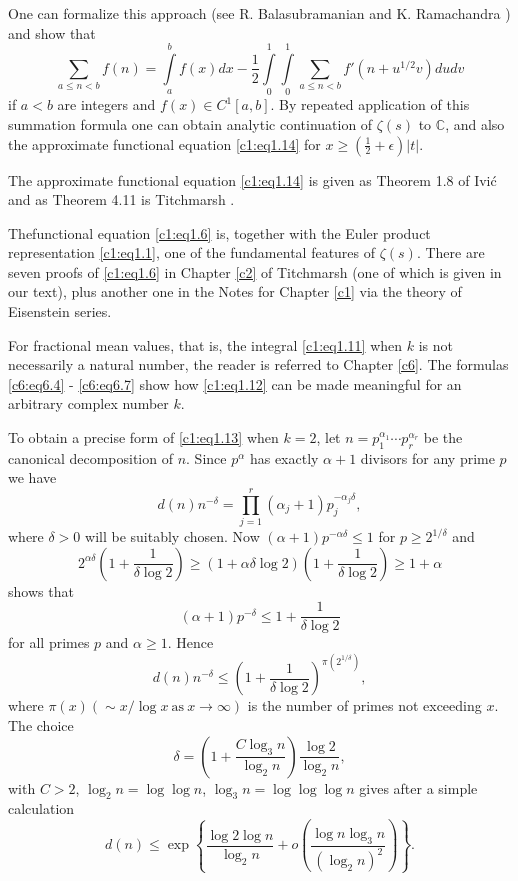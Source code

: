 One can formalize this approach (see R.  Balasubramanian and
K. Ramachandra \cite{Balasubramanian and Ramachandra2}) and show that
$$
\sum_{a\leq n < b} f(n) = \int\limits_a^b f(x) dx - \frac{1}{2}
\int\limits^1_0 \int\limits_0^1 \sum_{a \leq n < b} f' (n+ u^{1/2}v) du dv
$$
if $a< b$ are integers and $f(x) \in C^1 [a, b]$. By repeated
application of this summation formula one can obtain analytic
continuation of $\zeta(s)$ to $\mathbb{C}$, and also the approximate
functional equation \eqref{c1:eq1.14} for $x \geq \left(\frac{1}{2} +
\epsilon \right) |t|$.

The approximate functional equation \eqref{c1:eq1.14} is given as
Theorem 1.8 of Ivi\'c \cite{Ivic1} and as Theorem 4.11 is Titchmarsh \cite{Titchmarsh1}.

The\pageoriginale functional equation \eqref{c1:eq1.6} is, together
with the Euler product representation \eqref{c1:eq1.1}, one of the
fundamental features of $\zeta(s)$. There are seven proofs of
\eqref{c1:eq1.6} in Chapter \ref{c2} of Titchmarsh \cite{Titchmarsh1} (one of which is
given in our text), plus another one in the Notes for Chapter \ref{c1} via
the theory of Eisenstein series.

For fractional mean values, that is, the integral \eqref{c1:eq1.11}
when $k$ is not necessarily a natural number, the reader is referred
to Chapter \ref{c6}. The formulas \eqref{c6:eq6.4} - \eqref{c6:eq6.7} show
how \eqref{c1:eq1.12} can be made meaningful for an arbitrary complex
number $k$.

To obtain a precise form of \eqref{c1:eq1.13} when $k=2$, let $n=
p_1^{\alpha_1}\cdots p_r^{\alpha_r}$ be the canonical decomposition of
$n$. Since $p^\alpha$ has exactly $\alpha+1$ divisors for any prime
$p$ we have
$$
d(n) n^{- \delta}= \prod_{j=1}^r (\alpha_j + 1)p_j^{- \alpha_j \delta},
$$
where $\delta> 0$ will be suitably chosen. Now $(\alpha + 1)p^{- \alpha
\delta} \leq 1$ for $p \geq 2^{1/\delta}$ and
$$ 
2^{\alpha \delta}\left(1+ \frac{1}{\delta \log 2}\right) \geq (1+
\alpha \delta \log 2) \left(1+ \frac{1}{\delta \log 2} \right) \geq 1 + \alpha
$$ 
shows that 
$$
(\alpha + 1) p^{-\delta} \leq 1 + \frac{1}{\delta \log 2}
$$
for all primes $p$ and $\alpha \geq 1$. Hence
$$
d(n) n^{-\delta} \leq \left( 1+ \frac{1}{\delta \log 2}\right)^{\pi
  (2^{1/\delta})}, 
$$
where $\pi (x) (\sim x /\log x ~\text{as}~ x \to \infty)$ is the
number of primes not exceeding $x$. The choice
$$
\delta = \left(1+  \frac{C \log_3 n}{\log_2 n} \right) \frac{\log 2}{\log_2 n},
$$
with $C > 2$, $\log_2 n = \log \log n$, $\log_3 n = \log \log \log n$ gives after a simple calculation
$$
 d(n) \leq \exp \left\{\frac{\log 2 \log n}{\log_2 n}+ o \left(
\frac{\log n \log_3 n}{(\log_2 n)^2}\right) \right\}.
$$

